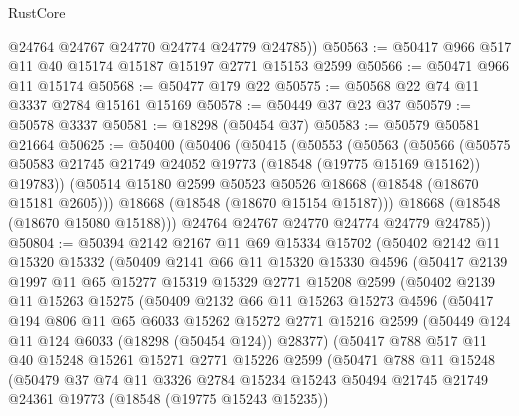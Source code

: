 \begin{lexlean}{RustCore}
\begin{coremodule}
        @24764
        @24767
        @24770
        @24774
        @24779
        @24785))
@50563 := @50417 @966 @517 @11 @40 @15174 @15187 @15197 @2771 @15153 @2599
@50566 := @50471 @966 @11 @15174
@50568 := @50477 @179 @22
@50575 := @50568 @22 @74 @11 @3337 @2784 @15161 @15169
@50578 := @50449 @37 @23 @37
@50579 := @50578 @3337
@50581 := @18298 (@50454 @37)
@50583 := @50579 @50581 @21664
@50625 := @50400
    (@50406
      (@50415
        (@50553
          (@50563
            (@50566
              (@50575 @50583 @21745 @21749 @24052 @19773 (@18548 (@19775 @15169 @15162)) @19783))
            (@50514 @15180 @2599 @50523 @50526 @18668 (@18548 (@18670 @15181 @2605)))
            @18668
            (@18548 (@18670 @15154 @15187)))
          @18668
          (@18548 (@18670 @15080 @15188)))
        @24764
        @24767
        @24770
        @24774
        @24779
        @24785))
@50804 := @50394
    @2142
    @2167
    @11
    @69
    @15334
    @15702
    (@50402
      @2142
      @11
      @15320
      @15332
      (@50409
        @2141
        @66
        @11
        @15320
        @15330
        @4596
        (@50417
          @2139
          @1997
          @11
          @65
          @15277
          @15319
          @15329
          @2771
          @15208
          @2599
          (@50402
            @2139
            @11
            @15263
            @15275
            (@50409
              @2132
              @66
              @11
              @15263
              @15273
              @4596
              (@50417
                @194
                @806
                @11
                @65
                @6033
                @15262
                @15272
                @2771
                @15216
                @2599
                (@50449 @124 @11 @124 @6033 (@18298 (@50454 @124)) @28377)
                (@50417
                  @788
                  @517
                  @11
                  @40
                  @15248
                  @15261
                  @15271
                  @2771
                  @15226
                  @2599
                  (@50471
                    @788
                    @11
                    @15248
                    (@50479
                      @37
                      @74
                      @11
                      @3326
                      @2784
                      @15234
                      @15243
                      @50494
                      @21745
                      @21749
                      @24361
                      @19773
                      (@18548 (@19775 @15243 @15235))

\end{coremodule}
\end{lexlean}
